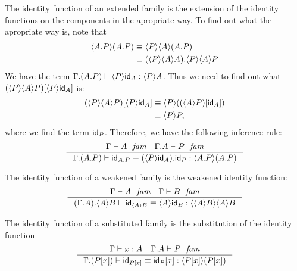 The identity function of an extended family is the extension of the identity
functions on the components in the apropriate way. To find out what the
apropriate way is, note that
\begin{align*}
\ctxwk{\ctxext{A}{P}}{\ctxext{A}{P}} & \jdeq \ctxwk{P}{{A}{\ctxext{A}{P}}}\\
& \jdeq \ctxext{\ctxwk{P}{{A}{A}}}{\ctxwk{P}{{A}{P}}}
\end{align*}
We have the term $\jterm{\ctxext{\Gamma}{{A}{P}}}{\ctxwk{P}{A}}{\ctxwk{P}{\idfunc[A]}}$.
Thus we need to find out what $\subst{\ctxwk{P}{\idfunc[A]}}{\ctxwk{P}{{A}{P}}}$ is:
\begin{align*}
\subst{\ctxwk{P}{\idfunc[A]}}{\ctxwk{P}{{A}{P}}} & \jdeq \ctxwk{P}{\subst{\idfunc[A]}{\ctxwk{A}{P}}}\\
& \jdeq \ctxwk{P}{P},
\end{align*}
where we find the term $\idfunc[P]$. Therefore, we have the following inference rule:
\begin{equation}
\inference{\jfam{\Gamma}{A}\quad\jfam{\ctxext{\Gamma}{A}}{P}}{\jtermeq{\ctxext{\Gamma}{{A}{P}}}{\ctxwk{\ctxext{A}{P}}{\ctxext{A}{P}}}{\idfunc[\ctxext{A}{P}]}{\ctxext{\ctxwk{P}{\idfunc[A]}}{\idfunc[P]}}}
\end{equation}

The identity function of a weakened family is the weakened identity function:
\begin{equation}
\inference{\jfam{\Gamma}{A}\quad\jfam{\Gamma}{B}}{\jtermeq{\ctxext{{\Gamma}{A}}{\ctxwk{A}{B}}}{\ctxwk{{A}{B}}{{A}{B}}}{\idfunc[\ctxwk{A}{B}]}{\ctxwk{A}{\idfunc[B]}}}
\end{equation}

The identity function of a substituted family is the substitution of the identity function
\begin{equation}
\inference{\jterm{\Gamma}{A}{x}\quad\jfam{\ctxext{\Gamma}{A}}{P}}{\jtermeq{\ctxext{\Gamma}{\subst{x}{P}}}{\ctxwk{\subst{x}{P}}{\subst{x}{P}}}{\idfunc[\subst{x}{P}]}{\subst{x}{\idfunc[P]}}}
\end{equation}
